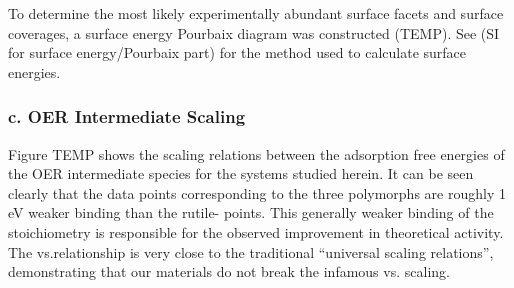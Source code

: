 To determine the most likely experimentally abundant surface facets and surface coverages, a surface energy Pourbaix diagram was constructed (TEMP).  %
See (SI for surface energy/Pourbaix part) for the method used to calculate surface energies.

\subsubsection{c. OER Intermediate Scaling}

Figure TEMP shows the scaling relations between the adsorption free energies of the OER intermediate species for the \IrOx systems studied herein.
It can be seen clearly that the data points corresponding to the three  polymorphs are roughly 1 eV weaker binding than the rutile- points.
This generally weaker binding of the  stoichiometry is responsible for the observed improvement in theoretical activity.
The \DGOOH vs.\DGOH relationship is very close to the traditional ``universal scaling relations'', demonstrating that our materials do not break the infamous \DGOOH vs. \DGOH scaling.

